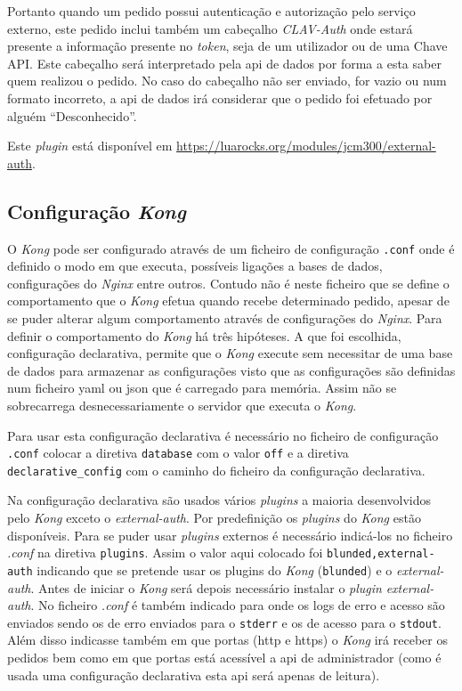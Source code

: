 Portanto quando um pedido possui autenticação e autorização pelo serviço externo, este pedido inclui também um cabeçalho \textit{CLAV-Auth} onde estará presente a informação presente no \textit{token}, seja de um utilizador ou de uma Chave API. Este cabeçalho será interpretado pela \acrshort{api} de dados por forma a esta saber quem realizou o pedido. No caso do cabeçalho não ser enviado, for vazio ou num formato incorreto, a \acrshort{api} de dados irá considerar que o pedido foi efetuado por alguém ``Desconhecido''.

Este \textit{plugin} está disponível em \url{https://luarocks.org/modules/jcm300/external-auth}.

\subsection{Configuração \textit{Kong}}
O \textit{Kong} pode ser configurado através de um ficheiro de configuração \texttt{.conf} onde é definido o modo em que executa, possíveis ligações a bases de dados, configurações do \textit{Nginx} entre outros. Contudo não é neste ficheiro que se define o comportamento que o \textit{Kong} efetua quando recebe determinado pedido, apesar de se puder alterar algum comportamento através de configurações do \textit{Nginx}. Para definir o comportamento do \textit{Kong} há três hipóteses. A que foi escolhida, configuração declarativa, permite que o \textit{Kong} execute sem necessitar de uma base de dados para armazenar as configurações visto que as configurações são definidas num ficheiro \acrshort{yaml} ou \acrshort{json} que é carregado para memória. Assim não se sobrecarrega desnecessariamente o servidor que executa o \textit{Kong}.

Para usar esta configuração declarativa é necessário no ficheiro de configuração \texttt{.conf} colocar a diretiva \texttt{database} com o valor \texttt{off} e a diretiva \texttt{declarative\_config} com o caminho do ficheiro da configuração declarativa.

Na configuração declarativa são usados vários \textit{plugins} a maioria desenvolvidos pelo \textit{Kong} exceto o \textit{external-auth}. Por predefinição os \textit{plugins} do \textit{Kong} estão disponíveis. Para se puder usar \textit{plugins} externos é necessário indicá-los no ficheiro \textit{.conf} na diretiva \texttt{plugins}. Assim o valor aqui colocado foi \texttt{blunded,external-auth} indicando que se pretende usar os plugins do \textit{Kong} (\texttt{blunded}) e o \textit{external-auth}. Antes de iniciar o \textit{Kong} será depois necessário instalar o \textit{plugin} \textit{external-auth}. No ficheiro \textit{.conf} é também indicado para onde os logs de erro e acesso são enviados sendo os de erro enviados para o \texttt{stderr} e os de acesso para o \texttt{stdout}. Além disso indicasse também em que portas (\acrshort{http} e \acrshort{https}) o \textit{Kong} irá receber os pedidos bem como em que portas está acessível a \acrshort{api} de administrador (como é usada uma configuração declarativa esta \acrshort{api} será apenas de leitura).

